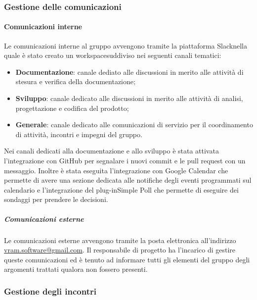 		\subsubsection{Gestione delle comunicazioni}
			\paragraph*{Comunicazioni interne}
				Le comunicazioni interne al gruppo avvengono tramite la piattaforma Slack\glosp nella quale è stato creato un workspace\glosp suddiviso nei seguenti canali tematici:
				\begin{itemize}
					\item \textbf{Documentazione}: canale dediato alle discussioni in merito alle attività di stesura e verifica della documentazione;
					\item \textbf{Sviluppo}: canale dedicato alle discussioni in merito alle attività di analisi, progettazione e codifica del prodotto;
					\item \textbf{Generale}: canale dedicato alle comunicazioni di servizio per il coordinamento di attività, incontri e impegni del gruppo.
				\end{itemize}
				Nei canali dedicati alla documentazione e allo sviluppo è stata attivata l'integrazione con GitHub per segnalare i nuovi commit e le pull request con un messaggio.
				Inoltre è stata eseguita l'integrazione con Google Calendar che permette di avere una sezione dedicata alle notifiche degli eventi programmati sul calendario e l'integrazione del plug-in\glosp Simple Poll che permette di eseguire dei sondaggi per prendere le decisioni.
			\subparagraph*{Comunicazioni esterne}
				Le comunicazioni esterne avvengono tramite la posta elettronica all'indirizzo \url{vram.software@gmail.com}.
				Il responsabile di progetto ha l'incarico di gestire queste comunicazioni ed è tenuto ad informare tutti gli elementi del gruppo degli argomenti trattati qualora non fossero presenti.
		\subsubsection{Gestione degli incontri}
